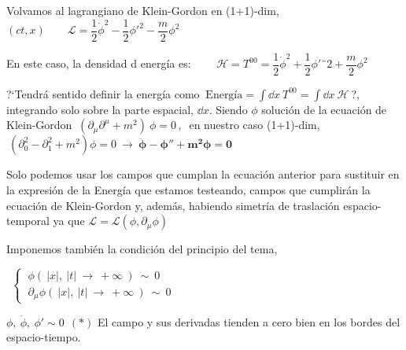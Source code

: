 \color{black}
\vspace{1cm}

Volvamos al lagrangiano de Klein-Gordon en (1+1)-dim, $(ct,x) \qquad \mathcal L = \dfrac 1 2 \dot \phi^2 - \dfrac 1 2 {\phi'}^2-\dfrac m 2 \phi^2$

En este caso, la densidad d energía es: $\qquad \mathcal H=T^{00}=\dfrac 1 2 \dot \phi^2 + \dfrac 1 2 {\phi'}¨2+\dfrac m 2 \phi^2$

?`Tendrá sentido definir la energía como $\ \text{Energía}=\displaystyle \int \dd x \ T^{00}=\int \dd x \ \mathcal H \ $?, integrando solo sobre la parte espacial, $\dd x$. Siendo $\phi$ solución de la ecuación de Klein-Gordon $\ (\partial_\mu \partial^\mu + m^2)\ \phi=0 \, , \ $ en nuestro caso (1+1)-dim, $\ (\partial_0^2-\partial_1^2+m^2)\phi=0 \ \to \ \boldsymbol{ \ddot \phi - \phi'' +m^2\phi=0}$

Solo podemos usar los campos que cumplan la ecuación anterior para sustituir en la expresión de la Energía que estamos testeando, campos que cumplirán la ecuación de Klein-Gordon y, además, habiendo simetría de traslación espacio-temporal ya que $\mathcal L=\mathcal L(\phi, \partial_\mu \phi)$

Imponemos también la condición del principio del tema, \begin{footnotesize}$\ \ \begin{cases} \ \phi(\ |x|,\ |t| \ \to \ +\infty \  ) \ \sim \ 0 \\ \ \partial_\mu \phi(\ |x|,\ |t| \ \to \ +\infty \  ) \ \sim \ 0  \end{cases} $\end{footnotesize} $ \phi, \ \dot \phi, \ \phi' \sim 0 \ \ (*)$ El campo y sus derivadas tienden a cero bien en los bordes del espacio-tiempo.

